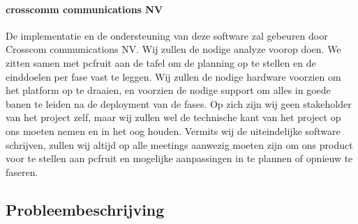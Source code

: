 \paragraph {crosscomm communications NV} De implementatie en de ondersteuning van deze software zal gebeuren door Crosscom communications NV. Wij zullen de nodige analyze voorop doen. We zitten samen met pcfruit aan de tafel om de planning op te stellen en de einddoelen per fase vast te leggen. Wij zullen de nodige hardware voorzien om het platform op te draaien, en voorzien de nodige support om alles in goede banen te leiden na de deployment van de fases. Op zich zijn wij geen stakeholder van het project zelf, maar wij zullen wel de technische kant van het project op ons moeten nemen en in het oog houden. Vermits wij de uiteindelijke software schrijven, zullen wij altijd op alle meetings aanwezig moeten zijn om ons product voor te stellen aan pcfruit en mogelijke aanpassingen in te plannen of opnieuw te faseren.


\subsection {Probleembeschrijving}

